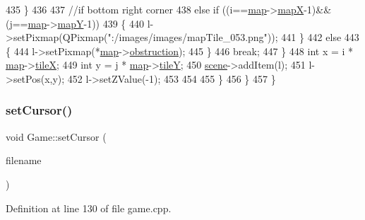 \begin{DoxyCode}
435                 \}
436 
437                 \textcolor{comment}{//if bottom right corner}
438                 \textcolor{keywordflow}{else} \textcolor{keywordflow}{if} ((i==\hyperlink{class_game_acef3a39fdf14be2c980b0dc11e7be402}{map}->\hyperlink{class_map_acfd20721da29a2e353598555e23e12f0}{mapX}-1)&&(j==\hyperlink{class_game_acef3a39fdf14be2c980b0dc11e7be402}{map}->\hyperlink{class_map_ae08efae9ac1453b2690985c627aca358}{mapY}-1))
439                 \{
440                     l->setPixmap(QPixmap(\textcolor{stringliteral}{":/images/images/mapTile\_053.png"}));
441                 \}
442                 \textcolor{keywordflow}{else}
443                 \{
444                     l->setPixmap(*\hyperlink{class_game_acef3a39fdf14be2c980b0dc11e7be402}{map}->\hyperlink{class_map_af0167137084000cfb58a33df8474bcbe}{obstruction});
445                 \}
446                 \textcolor{keywordflow}{break};
447             \}
448             \textcolor{keywordtype}{int} x = i * \hyperlink{class_game_acef3a39fdf14be2c980b0dc11e7be402}{map}->\hyperlink{class_map_af2aa425dd22aba483ae973c4a15fe934}{tileX};
449             \textcolor{keywordtype}{int} y = j * \hyperlink{class_game_acef3a39fdf14be2c980b0dc11e7be402}{map}->\hyperlink{class_map_a483dfba507cee9d2fa60a074992b1fcf}{tileY};
450             \hyperlink{class_game_a8119e3b9a632906c6808fa294b46a92a}{scene}->addItem(l);
451             l->setPos(x,y);
452             l->setZValue(-1);
453 
454 
455         \}
456     \}
457 \}
\end{DoxyCode}
\mbox{\label{class_game_a7272e282812b8af0be83044db196dc6c}} 
\subsubsection{\texorpdfstring{set\+Cursor()}{setCursor()}}
{\footnotesize\ttfamily void Game\+::set\+Cursor (\begin{DoxyParamCaption}\item[{Q\+String}]{filename }\end{DoxyParamCaption})}



Definition at line 130 of file game.\+cpp.


